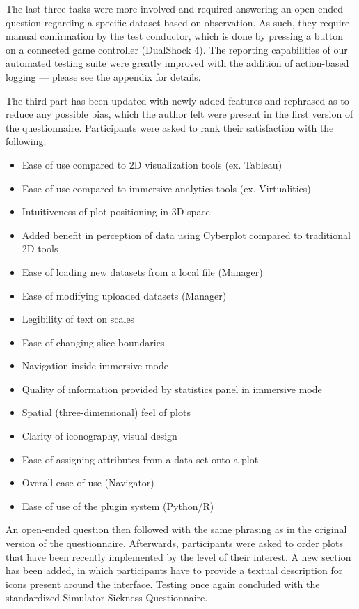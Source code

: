 \documentclass[thesis=M,english,hidelinks]{FITthesisXE}[2012/06/26]
\begin{document}
The last three tasks were more involved and required answering an open-ended question regarding a specific dataset based on observation. As such, they require manual confirmation by the test conductor, which is done by pressing a button on a connected game controller (DualShock 4). The reporting capabilities of our automated testing suite were greatly improved with the addition of action-based logging --- please see the appendix for details.

\newpage

The third part has been updated with newly added features and rephrased as to reduce any possible bias, which the author felt were present in the first version of the questionnaire. Participants were asked to rank their satisfaction with the following:

\begin{itemize}
\item Ease of use compared to 2D visualization tools (ex. Tableau)
\item Ease of use compared to immersive analytics tools (ex. Virtualitics)
\item Intuitiveness of plot positioning in 3D space
\item Added benefit in perception of data using Cyberplot compared to traditional 2D tools
\item Ease of loading new datasets from a local file (Manager)
\item Ease of modifying uploaded datasets (Manager)
\item Legibility of text on scales
\item Ease of changing slice boundaries
\item Navigation inside immersive mode
\item Quality of information provided by statistics panel in immersive mode
\item Spatial (three-dimensional) feel of plots
\item Clarity of iconography, visual design
\item Ease of assigning attributes from a data set onto a plot
\item Overall ease of use (Navigator)
\item Ease of use of the plugin system (Python/R)
\end{itemize}

An open-ended question then followed with the same phrasing as in the original version of the questionnaire. Afterwards, participants were asked to order plots that have been recently implemented by the level of their interest. A new section has been added, in which participants have to provide a textual description for icons present around the interface. Testing once again concluded with the standardized Simulator Sickness Questionnaire.
\end{document}
